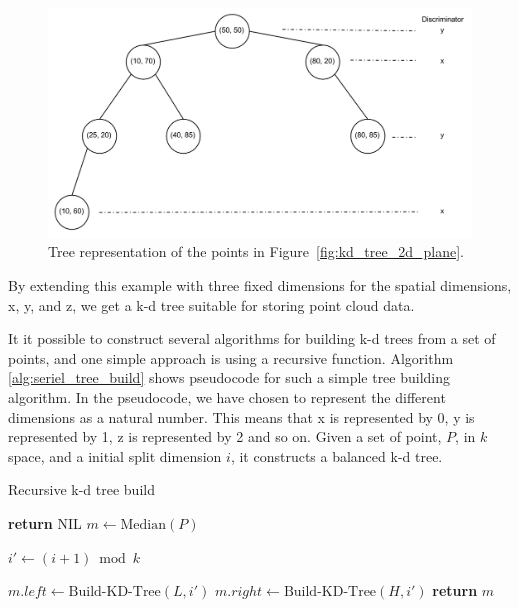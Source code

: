 \begin{figure}[ht!]
    \centering
    \includegraphics[width=120mm]{../gfx/kd_tree_illustration_tree.png}
    \caption{Tree representation of the points in Figure~\ref{fig:kd_tree_2d_plane}.}
    \label{fig:kd_tree_2d}
\end{figure}

By extending this example with three fixed dimensions for the spatial dimensions, x, y, and z, we get a k-d tree suitable for storing point cloud data.

It it possible to construct several algorithms for building k-d trees from a set of points, and one simple approach is using a recursive function. Algorithm \ref{alg:seriel_tree_build} shows pseudocode for such a simple tree building algorithm. In the pseudocode, we have chosen to represent the different dimensions as a natural number. This means that x is represented by 0, y is represented by 1, z is represented by 2 and so on. Given a set of point, $P$, in $k$ space, and a initial split dimension $i$, it constructs a balanced k-d tree.

\begin{algorithm}
\caption{Recursive k-d tree build}
\label{alg:seriel_tree_build}
\begin{algorithmic}
         
            \State \textbf{return} NIL
        \Else
            \State $m \gets \text{Median}(P)$

            \State {}
            \State {}

            \State $i' \gets (i + 1) \bmod k$ 

            \State $m.left \gets \text{Build-KD-Tree}(L, i')$
            \State $m.right \gets \text{Build-KD-Tree}(H, i')$
        \EndIf
        \State \textbf{return} $m$
    \EndFunction
\end{algorithmic}
\end{algorithm}

